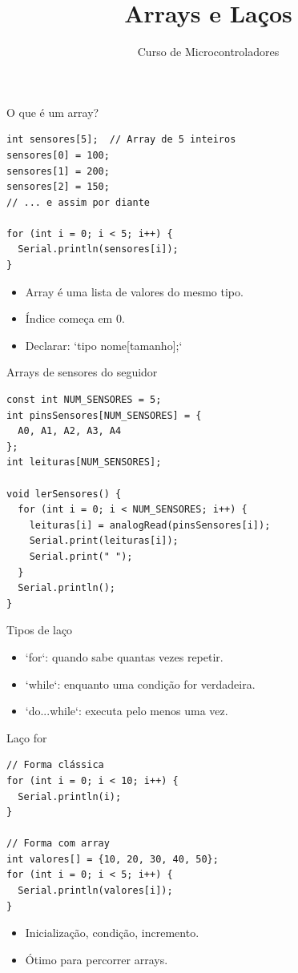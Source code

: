 \documentclass[10pt]{beamer}
\title{Arrays e Laços}
\subtitle{Curso de Microcontroladores}
\author{}
\date{}
\begin{document}
\begin{frame}
  \titlepage
\end{frame}

\begin{frame}[fragile]{O que é um array?}
\begin{lstlisting}
int sensores[5];  // Array de 5 inteiros
sensores[0] = 100;
sensores[1] = 200;
sensores[2] = 150;
// ... e assim por diante

for (int i = 0; i < 5; i++) {
  Serial.println(sensores[i]);
}
\end{lstlisting}

  \begin{itemize}
    \item Array é uma lista de valores do mesmo tipo.
    \item Índice começa em 0.
    \item Declarar: `tipo nome[tamanho];`
  \end{itemize}
\end{frame}

\begin{frame}[fragile]{Arrays de sensores do seguidor}
\begin{lstlisting}
const int NUM_SENSORES = 5;
int pinsSensores[NUM_SENSORES] = {
  A0, A1, A2, A3, A4
};
int leituras[NUM_SENSORES];

void lerSensores() {
  for (int i = 0; i < NUM_SENSORES; i++) {
    leituras[i] = analogRead(pinsSensores[i]);
    Serial.print(leituras[i]);
    Serial.print(" ");
  }
  Serial.println();
}
\end{lstlisting}
\end{frame}

\begin{frame}{Tipos de laço}
  \begin{itemize}
    \item `for`: quando sabe quantas vezes repetir.
    \item `while`: enquanto uma condição for verdadeira.
    \item `do...while`: executa pelo menos uma vez.
  \end{itemize}
\end{frame}

\begin{frame}[fragile]{Laço for}
\begin{lstlisting}
// Forma clássica
for (int i = 0; i < 10; i++) {
  Serial.println(i);
}

// Forma com array
int valores[] = {10, 20, 30, 40, 50};
for (int i = 0; i < 5; i++) {
  Serial.println(valores[i]);
}
\end{lstlisting}

  \begin{itemize}
    \item Inicialização, condição, incremento.
    \item Ótimo para percorrer arrays.
  \end{itemize}
\end{frame}
\end{document}
